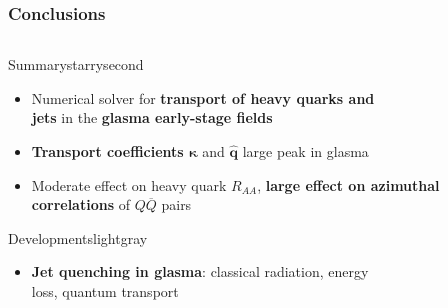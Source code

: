\documentclass[aspectratio=169,11pt,usenames,dvipsnames]{beamer}
\begin{document}
\begin{frame}
    \frametitle{Conclusions}
    \vspace{-13pt}
    \begin{center}
        \begin{columns}
                \vspace{-10pt}
                \begin{center}
                \begin{custombox2}{Summary}{starrysecond}
                    \footnotesize
                    \begin{varwidth}{\textwidth}
                    \begin{itemize}\itemsep0em 
                        \item Numerical solver for {\bfseries\color{starrysecond}transport of heavy quarks and} \\ {\bfseries\color{starrysecond}jets} in the {\bfseries\color{starrysecond}glasma early-stage fields}
                        \item {\bfseries\color{starrysecond}Transport coefficients $\boldsymbol{\kappa}$} and {\bfseries\color{starrysecond}$\boldsymbol{\hat{q}}$} large peak in glasma
                        \item Moderate effect on heavy quark $R_{AA}$, {\bfseries\color{starrysecond}large effect on azimuthal correlations} of $Q\overline{Q}$ pairs
                    \end{itemize}
                    \end{varwidth}
                \end{custombox2}
                \vspace{10pt}
                \begin{custombox2}{{\color{jyured}Developments}}{lightgray}
                    \footnotesize
                    \begin{varwidth}{\textwidth}
                    \begin{itemize}\itemsep0em 
                        \item {\bfseries\color{jyured} Jet quenching in glasma}: classical radiation, energy \\ loss, quantum transport

\end{itemize}
\end{varwidth}
\end{custombox2}
\end{center}
\end{columns}
\end{center}
\end{frame}
\end{document}
